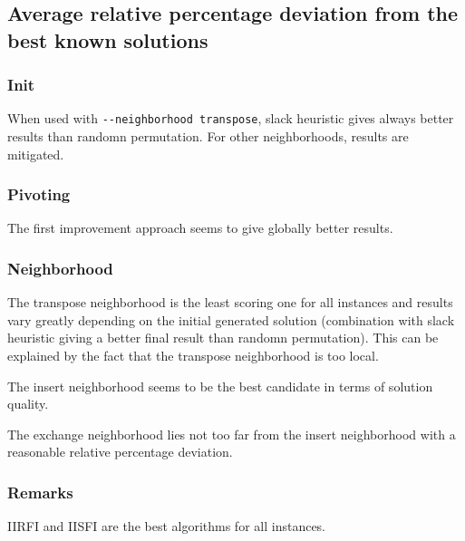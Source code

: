 \subsection{Average relative percentage deviation from the best known solutions}

\subsubsection{Init}

When used with \verb!--neighborhood transpose!, slack heuristic gives always better results than randomn permutation. For other neighborhoods, results are mitigated.

\subsubsection{Pivoting}

The first improvement approach seems to give globally better results.

\subsubsection{Neighborhood}

The transpose neighborhood is the least scoring one for all instances and results vary greatly depending on the initial generated solution (combination with slack heuristic giving a better final result than randomn permutation). This can be explained by the fact that the transpose neighborhood is too local.

The insert neighborhood seems to be the best candidate in terms of solution quality.

The exchange neighborhood lies not too far from the insert neighborhood with a reasonable relative percentage deviation.



\subsubsection{Remarks}

IIRFI and IISFI are the best algorithms for all instances.